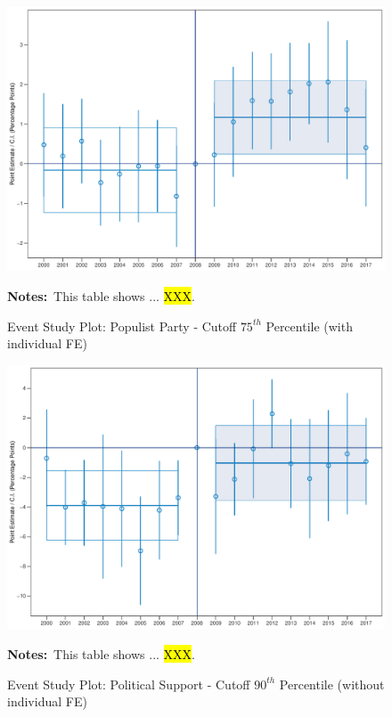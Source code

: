 \documentclass[11pt]{article}
\begin{document}
\begin{figure}[htbp!]
    \centering
    \caption{Event Study Plot: Populist Party - Cutoff $75^{th}$ Percentile (with individual FE)}\label{fig:dynamic_did_cbk_past_mean_pp_p75_ife}
    \includegraphics[width=1\linewidth]{events/dynamic_did_cbk_past_mean_pp_p75_ife}
    \begin{tablenotes}
        \footnotesize
        \item \textbf{Notes:}~This table shows ... \hl{XXX}.
    \end{tablenotes} 
\end{figure}


\begin{figure}[htbp!]
    \centering
    \caption{Event Study Plot: Political Support - Cutoff $90^{th}$ Percentile (without individual FE)}\label{fig:dynamic_did_cbk_past_mean_ps_p90_noife}
    \includegraphics[width=1\linewidth]{events/dynamic_did_cbk_past_mean_ps_p90_noife}
    \begin{tablenotes}
        \footnotesize
        \item \textbf{Notes:}~This table shows ... \hl{XXX}.
    \end{tablenotes} 
\end{figure}
\end{document}
